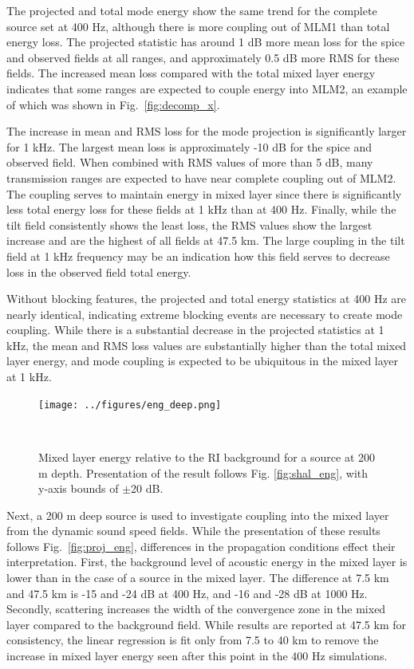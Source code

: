 \documentclass[preprint,NumberedRefs]{JASA}
\begin{document}
The projected and total mode energy show the same trend for the complete source set at 400 Hz, although there is more coupling out of MLM1 than total energy loss. The projected statistic has around 1 dB more mean loss for the spice and observed fields at all ranges, and approximately 0.5 dB more RMS for these fields. The increased mean loss compared with the total mixed layer energy indicates that some ranges are expected to couple energy into MLM2, an example of which was shown in Fig.~\ref{fig:decomp_x}.

The increase in mean and RMS loss for the mode projection is significantly larger for 1 kHz. The largest mean loss is approximately -10 dB for the spice and observed field. When combined with RMS values of more than 5 dB, many transmission ranges are expected to have near complete coupling out of MLM2. The coupling serves to maintain energy in mixed layer since there is significantly less total energy loss for these fields at 1 kHz than at 400 Hz. Finally, while the tilt field consistently shows the least loss, the RMS values show the largest increase and are the highest of all fields at 47.5 km. The large coupling in the tilt field at 1 kHz frequency may be an indication how this field serves to decrease loss in the observed field total energy.

Without blocking features, the projected and total energy statistics at 400 Hz are nearly identical, indicating extreme blocking events are necessary to create mode coupling. While there is a substantial decrease in the projected statistics at 1 kHz, the mean and RMS loss values are substantially higher than the total mixed layer energy, and mode coupling is expected to be ubiquitous in the mixed layer at 1 kHz.

\begin{figure}
\texttt{[image: ../figures/eng\_deep.png]}
    \caption{Mixed layer energy relative to the RI background for a source at 200 m depth. Presentation of the result follows Fig. \ref{fig:shal_eng}, with y-axis bounds of $\pm$20 dB.}
    \label{fig:deep_proj}
\end{figure}
Next, a 200 m deep source is used to investigate coupling into the mixed layer from the dynamic sound speed fields. While the presentation of these results follows Fig.~\ref{fig:proj_eng}, differences in the propagation conditions effect their interpretation. First, the background level of acoustic energy in the mixed layer is lower than in the case of a source in the mixed layer. The difference at 7.5 km and 47.5 km is -15 and -24 dB at 400 Hz, and -16 and -28 dB at 1000 Hz. Secondly, scattering increases the width of the convergence zone in the mixed layer compared to the background field. While results are reported at 47.5 km for consistency, the linear regression is fit only from 7.5 to 40 km to remove the increase in mixed layer energy seen after this point in the 400 Hz simulations.
\end{document}
